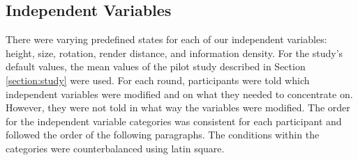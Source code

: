 \subsection{Independent Variables}
\label{sec:independentVariables}
There were varying predefined states for each of our independent variables: height, size, rotation, render distance, and information density. For the study's default values, the mean values of the pilot study described in Section \ref{section:study} were used. 
For each round, participants were told which independent variables were modified and on what they needed to concentrate on. However, they were not told in what way the variables were modified. The order for the independent variable categories was consistent for each participant and followed the order of the following paragraphs. The conditions within the categories were counterbalanced using latin square.



